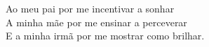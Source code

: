 Ao meu pai por me incentivar a sonhar \\
A minha mãe por me ensinar a perceverar \\
E a minha irmã por me mostrar como brilhar.